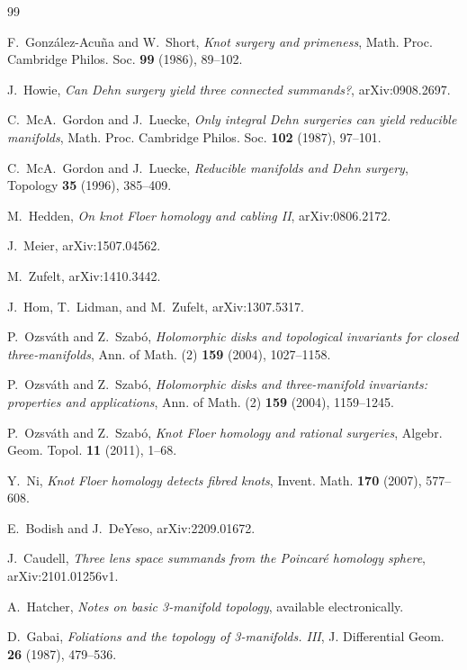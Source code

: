 \documentclass[12pt]{article}
\theoremstyle{definition}
\begin{document}
\begin{thebibliography}{99}

F.~González-Acuña and W.~Short,
\emph{Knot surgery and primeness},
Math. Proc. Cambridge Philos. Soc. \textbf{99} (1986), 89--102.

J.~Howie,
\emph{Can Dehn surgery yield three connected summands?},
arXiv:0908.2697.

C.~McA.~Gordon and J.~Luecke,
\emph{Only integral Dehn surgeries can yield reducible manifolds},
Math. Proc. Cambridge Philos. Soc. \textbf{102} (1987), 97--101.

C.~McA.~Gordon and J.~Luecke,
\emph{Reducible manifolds and Dehn surgery},
Topology \textbf{35} (1996), 385--409.

M.~Hedden,
\emph{On knot Floer homology and cabling II},
arXiv:0806.2172.

J.~Meier,
arXiv:1507.04562.

M.~Zufelt,
arXiv:1410.3442.

J.~Hom, T.~Lidman, and M.~Zufelt,
arXiv:1307.5317.

P.~Ozsváth and Z.~Szabó,
\emph{Holomorphic disks and topological invariants for closed three-manifolds},
Ann. of Math. (2) \textbf{159} (2004), 1027--1158.

P.~Ozsváth and Z.~Szabó,
\emph{Holomorphic disks and three-manifold invariants: properties and applications},
Ann. of Math. (2) \textbf{159} (2004), 1159--1245.

P.~Ozsváth and Z.~Szabó,
\emph{Knot Floer homology and rational surgeries},
Algebr. Geom. Topol. \textbf{11} (2011), 1--68.

Y.~Ni,
\emph{Knot Floer homology detects fibred knots},
Invent. Math. \textbf{170} (2007), 577--608.

E.~Bodish and J.~DeYeso,
arXiv:2209.01672.

J.~Caudell,
\emph{Three lens space summands from the Poincaré homology sphere},
arXiv:2101.01256v1.

A.~Hatcher,
\emph{Notes on basic 3-manifold topology},
available electronically.

D.~Gabai,
\emph{Foliations and the topology of 3-manifolds. III},
J. Differential Geom. \textbf{26} (1987), 479--536.

\end{thebibliography}
\end{document}
